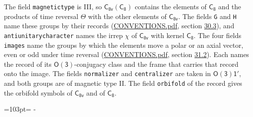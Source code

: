 \documentclass[10pt,a4paper]{article}
\newcommand{\needspace}[1]{\par\penalty-100\begingroup\dimen0=#1\relax\dimen2=\pagegoal
  \advance\dimen2-\pagetotal\ifdim\dimen0>\dimen2\relax\ifdim\dimen2>0pt\vfil\break\fi\fi
  \endgroup}
\numberwithin{equation}{section}
\newcommand{\grp}[1]{\mathsf{#1}}
\begin{document}
The field \texttt{magnetictype} is III, so $\grp{C_{8v}}(\grp{C_{8}})$ contains the elements of $\grp{C_{8}}$ and the products of time reversal $\varTheta$ with the other elements of $\grp{C_{8v}}$. The fields \texttt{G} and \texttt{H} name these groups by their records (\href{../../CONVENTIONS.pdf}{CONVENTIONS.pdf}, section \href{../../CONVENTIONS.pdf\#conv.30.3}{30.3}), and \texttt{antiunitarycharacter} names the irrep $\chi$ of $\grp{C_{8v}}$ with kernel $\grp{C_{8}}$. The four fields \texttt{images} name the groups by which the elements move a polar or an axial vector, even or odd under time reversal (\href{../../CONVENTIONS.pdf}{CONVENTIONS.pdf}, section \href{../../CONVENTIONS.pdf\#conv.31.2}{31.2}). Each names the record of its $\grp{O(3)}$-conjugacy class and the frame that carries that record onto the image. The fields \texttt{normalizer} and \texttt{centralizer} are taken in $\grp{O(3)1'}$, and both groups are of magnetic type II. The field \texttt{orbifold} of the record gives the orbifold symbols of $\grp{C_{8v}}$ and of $\grp{C_{8}}$.
\needspace{103pt}
\end{document}
